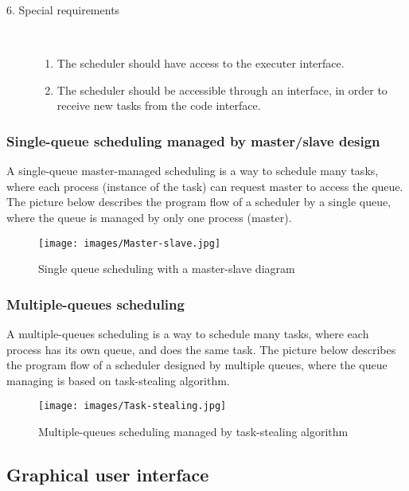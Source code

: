 \begin{description}
	\item [6. Special requirements]\hfill \\
	\vspace{-6.5mm}
	\begin{enumerate}
		\item The scheduler should have access to the executer interface.
		\item The scheduler should be accessible through an interface, in order to receive new tasks from the code interface.
	\end{enumerate}
	
\end{description}
\vspace{0.5cm}
\subsubsection{Single-queue scheduling managed by master/slave design }
\vspace{0.5cm}
A single-queue master-managed scheduling is a way to schedule many tasks, where each process (instance of the task) can request master to access the queue. The picture below describes the program flow of a scheduler by a single queue, where the queue is managed by only one process (master). 
\vspace{1cm}
	\begin{figure}[H]
	\centering
	\texttt{[image: images/Master-slave.jpg]}
	\caption{Single queue scheduling with a master-slave diagram} 
	\end{figure}
\newpage
\subsubsection{Multiple-queues scheduling}

\vspace{0.5cm}
A multiple-queues scheduling is a way to schedule many tasks, where each process has its own queue, and does the same task. The picture below describes the program flow of a scheduler designed by multiple queues, where the queue managing is based on task-stealing algorithm.
\vspace{1cm}
	\begin{figure}[H]
	\centering
	\texttt{[image: images/Task-stealing.jpg]}
	\caption{Multiple-queues scheduling managed by task-stealing algorithm}
	\end{figure}
\newpage
	
\subsection{Graphical user interface}
